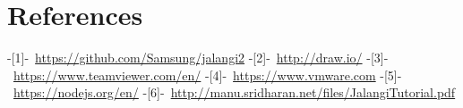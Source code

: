 \documentclass[a4paper]{scrartcl}
\begin{document}
\section{References}
\mbox{-[1]- \url{https://github.com/Samsung/jalangi2}}
\newline
\mbox{-[2]- \url{http://draw.io/}}
\newline
\mbox{-[3]- \url{https://www.teamviewer.com/en/}}
\newline
\mbox{-[4]- \url{https://www.vmware.com}}
\newline
\mbox{-[5]- \url{https://nodejs.org/en/}}
\newline
\mbox{-[6]- \url{http://manu.sridharan.net/files/JalangiTutorial.pdf}}
\end{document}
